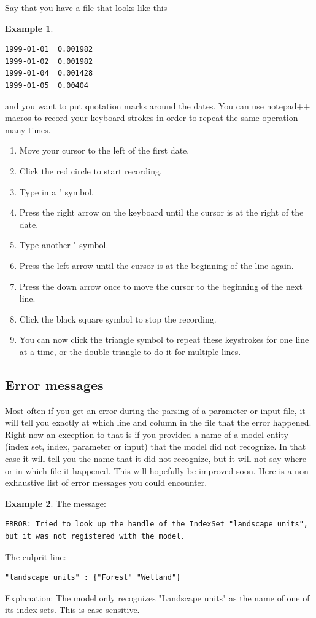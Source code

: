 \documentclass[11pt]{article}
\theoremstyle{definition}
\newtheorem{myexample}{Example}
\newenvironment{example}%
  {\begin{lrbox}{\examplebox}%
   \begin{minipage}{\dimexpr\linewidth-2\fboxsep}
   \begin{myexample}}%
  {\end{myexample}%
   \end{minipage}%
   \end{lrbox}%
   \begin{trivlist}
     \item[]\colorbox{silver}{\usebox\examplebox}
   \end{trivlist}}
\begin{document}
Say that you have a file that looks like this
\begin{example}
\begin{lstlisting}
1999-01-01	0.001982
1999-01-02	0.001982
1999-01-04	0.001428
1999-01-05	0.00404
\end{lstlisting}
\end{example}
and you want to put quotation marks around the dates. You can use notepad++ macros to record your keyboard strokes in order to repeat the same operation many times.
\begin{enumerate}[i]
\item Move your cursor to the left of the first date.
\item Click the red circle to start recording.
\item Type in a " symbol.
\item Press the right arrow on the keyboard until the cursor is at the right of the date.
\item Type another " symbol.
\item Press the left arrow until the cursor is at the beginning of the line again.
\item Press the down arrow once to move the cursor to the beginning of the next line.
\item Click the black square symbol to stop the recording.
\item You can now click the triangle symbol to repeat these keystrokes for one line at a time, or the double triangle to do it for multiple lines.
\end{enumerate}

\subsection{Error messages}

Most often if you get an error during the parsing of a parameter or input file, it will tell you exactly at which line and column in the file that the error happened. Right now an exception to that is if you provided a name of a model entity (index set, index, parameter or input) that the model did not recognize. In that case it will tell you the name that it did not recognize, but it will not say where or in which file it happened. This will hopefully be improved soon. Here is a non-exhaustive list of error messages you could encounter.

\begin{example}
The message:
\begin{lstlisting}
ERROR: Tried to look up the handle of the IndexSet "landscape units", but it was not registered with the model.
\end{lstlisting}
The culprit line:
\begin{lstlisting}
"landscape units" : {"Forest" "Wetland"}
\end{lstlisting}
Explanation: The model only recognizes "Landscape units" as the name of one of its index sets. This is case sensitive.
\end{example}
\end{document}
